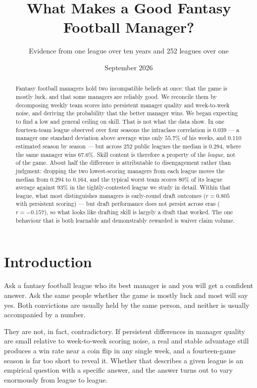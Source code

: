 \documentclass[11pt]{article}
\title{\vspace{-2.2em}What Makes a Good Fantasy Football Manager?}
\author{Evidence from one league over ten years and 252 leagues over one}
\date{September 2026}
\begin{document}
\maketitle
\vspace{-1.2em}

\begin{abstract}
\noindent Fantasy football managers hold two incompatible beliefs at once: that
the game is mostly luck, and that some managers are reliably good. We reconcile
them by decomposing weekly team scores into persistent manager quality and
week-to-week noise, and deriving the probability that the better manager wins.
We began expecting to find a low and general ceiling on skill. That is not what
the data show. In one fourteen-team league observed over four seasons the
intraclass correlation is $0.039$ --- a manager one standard deviation above
average wins only $55.7\%$ of his weeks, and $0.110$ estimated season by season
--- but across 252 public leagues the median is $0.294$, where the same manager
wins $67.6\%$. Skill content is
therefore a property of the \emph{league}, not of the game. About half the
difference is attributable to disengagement rather than judgment: dropping the
two lowest-scoring managers from each league moves the median from $0.294$ to
$0.164$, and the typical worst team scores $80\%$ of its league average against
$93\%$ in the tightly-contested league we study in detail. Within that league,
what most distinguishes managers is early-round draft outcomes ($r=0.805$ with
persistent scoring) --- but draft performance does not persist across eras
($r=-0.157$), so what looks like drafting skill is largely a draft that worked.
The one behaviour that is both learnable and demonstrably rewarded is waiver
claim volume.
\end{abstract}

\section{Introduction}

Ask a fantasy football league who its best manager is and you will get a
confident answer. Ask the same people whether the game is mostly luck and most
will say yes. Both convictions are usually held by the same person, and neither
is usually accompanied by a number.

They are not, in fact, contradictory. If persistent differences in manager
quality are small relative to week-to-week scoring noise, a real and stable
advantage still produces a win rate near a coin flip in any single week, and a
fourteen-game season is far too short to reveal it. Whether that describes a
given league is an empirical question with a specific answer, and the answer
turns out to vary enormously from league to league.
\end{document}
